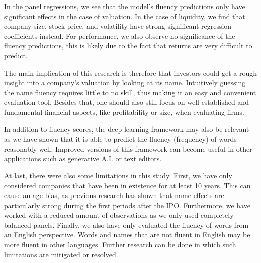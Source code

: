 \documentclass[11pt]{article}
\begin{document}
In the panel regressions, we see that the model's fluency predictions only have significant effects in the case of valuation. In the case of liquidity, we find that company size, stock price, and volatility have strong significant regression coefficients instead. For performance, we also observe no significance of the fluency predictions, this is likely due to the fact that returns are very difficult to predict.

The main implication of this research is therefore that investors could get a rough insight into a company's valuation by looking at its name. Intuitively guessing the name fluency requires little to no skill, thus making it an easy and convenient evaluation tool. Besides that, one should also still focus on well-established and fundamental financial aspects, like profitability or size, when evaluating firms. 

In addition to fluency scores, the deep learning framework may also be relevant as we have shown that it is able to predict the fluency (frequency) of words reasonably well. Improved versions of this framework can become useful in other applications such as generative A.I. or text editors.

At last, there were also some limitations in this study. First, we have only considered companies that have been in existence for at least 10 years. This can cause an age bias, as previous research has shown that name effects are particularly strong during the first periods after the IPO. Furthermore, we have worked with a reduced amount of observations as we only used completely balanced panels. Finally, we also have only evaluated the fluency of words from an English perspective. Words and names that are not fluent in English may be more fluent in other languages.
Further research can be done in which such limitations are mitigated or resolved.



























\newpage


\end{document}
